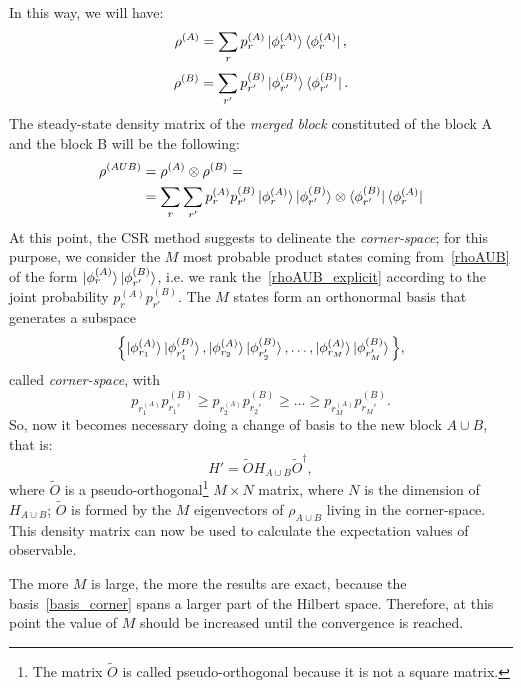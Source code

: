 In this way, we will have:
\begin{equation}
    \rho^{(A)} = \sum_r p_r^{(A)}\ket{\phi_r^{(A)}}\bra{\phi_r^{(A)}},
\end{equation}
\begin{equation}
    \rho^{(B)} = \sum_{r'} p_{r'}^{(B)}\ket{\phi_{r'}^{(B)}}\bra{\phi_{r'}^{(B)}}.
\end{equation}
The steady-state density matrix of the \emph{merged block} constituted of the block A and the block B will be the following:
\begin{align}
\label{rhoAUB}
    \rho^{(AUB)} &= \rho^{(A)} \otimes \rho^{(B)} = \\
    \label{rhoAUB_explicit}
    &= \sum_{r} \sum_{r'} p_r^{(A)}p_{r'}^{(B)}\ket{\phi_r^{(A)}}\ket{\phi_{r'}^{(B)}} \otimes \bra{\phi_{r'}^{(B)}}\bra{\phi_{r}^{(A)}}
\end{align}
At this point, the CSR method suggests to delineate the \emph{corner-space}; for this purpose, we consider the $M$ most probable product states coming from~\ref{rhoAUB} of the form $\ket{\phi_{r}^{(A)}}\ket{\phi_{r'}^{(B)}}$, i.e. we rank the~\ref{rhoAUB_explicit} according to the joint probability $p_r^{(A)}p_{r'}^{(B)}$. The $M$ states form an orthonormal basis that generates a subspace
\begin{equation}
\label{basis_corner}
    \Bigl\{\ket{\phi_{r_1}^{(A)}}\ket{\phi_{r_1'}^{(B)}}, \ket{\phi_{r_2}^{(A)}}\ket{\phi_{r_2'}^{(B)}}, \dots, \ket{\phi_{r_M}^{(A)}}\ket{\phi_{r_M'}^{(B)}} \Bigl\},
\end{equation}
called \emph{corner-space}, with
\begin{equation*}
    p_r_1^{(A)}p_{r_1'}^{(B)} \geq p_r_2^{(A)}p_{r_2'}^{(B)} \geq \dots \geq p_r_M^{(A)}p_{r_M'}^{(B)}.
\end{equation*}
So, now it becomes necessary doing a change of basis to the new block $A \cup B$, that is:
\begin{equation}
    H' = \tilde{O} H_{A\cup B} \tilde{O}^\dagger,
\end{equation}
where $\tilde{O}$ is a pseudo-orthogonal\footnote{The matrix $\tilde{O}$ is called pseudo-orthogonal because it is not a square matrix.} $M\times N$ matrix, where $N$ is the dimension of $H_{A\cup B}$; $\tilde{O}$ is formed by the $M$ eigenvectors of $\rho_{A\cup B}$ living in the corner-space. This density matrix can now be used to calculate the expectation values of observable.

The more $M$ is large, the more the results are exact, because the basis~\ref{basis_corner} spans a larger part of the Hilbert space. Therefore, at this point the value of $M$ should be increased until the convergence is reached.

